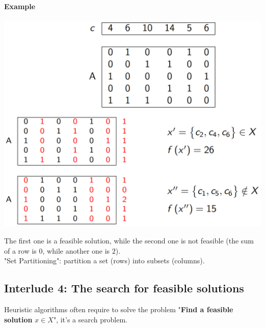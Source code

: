 \documentclass[11pt]{article}
\begin{document}
	\paragraph{Example}
	\begin{center}
		\includegraphics[width=\columnwidth]{img/SPP1}
	\end{center}
	The first one is a feasible solution, while the second one is not feasible (the sum of a row is $0$, while another one is $2$).\\
	
	"Set Partitioning": partition a set (rows) into subsets (columns).\\
	
	\newpage
	
	\subsection*{Interlude 4: The search for feasible solutions}
	Heuristic algorithms often require to solve the problem "\textbf{Find a feasible solution} $x \in X$", it's a search problem. \\
	
\end{document}
